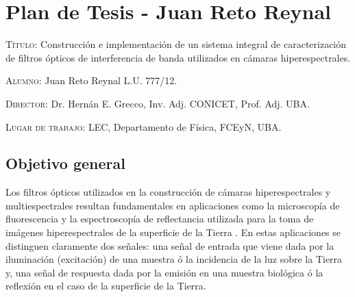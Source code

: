 \documentclass{ctuthesis}
\begin{document}
\maketitle
\renewcommand{\chaptername}{Capítulo}
\renewcommand{\figurename}{Figura}
\chapter*{Plan de Tesis - Juan Reto Reynal}


\textsc{Título:} Construcción e implementación de un sistema integral de 
caracterización de filtros ópticos de interferencia de banda utilizados en 
cámaras 
hiperespectrales.


\hspace{-0.4cm}\textsc{Alumno:} Juan Reto Reynal L.U. 777/12.

\hspace{-0.4cm}\textsc{Director:} Dr. Hernán E. Grecco, Inv. Adj. CONICET, Prof. Adj. UBA.

\hspace{-0.4cm}\textsc{Lugar de trabajo:} LEC, Departamento de Física, FCEyN, UBA.


\section*{Objetivo general}

\hspace{0.5cm} Los filtros ópticos utilizados en la construcción de cámaras 
hiperespectrales y 
multiespectrales resultan fundamentales en aplicaciones como la microscopía de 
fluorescencia \cite{Grecco2016} y la espectroscopía de reflectancia 
utilizada para la toma de 
imágenes hiperespectrales de la superficie de la Tierra \cite{Hogg2008}. En 
estas aplicaciones 
se distinguen claramente dos señales: una señal de entrada que viene dada por 
la iluminación (excitación) de una muestra ó la incidencia de la luz sobre la 
Tierra y, una señal de respuesta dada por la emisión en una muestra 
biológica ó la reflexión en el caso de la superficie de la Tierra.
\end{document}
